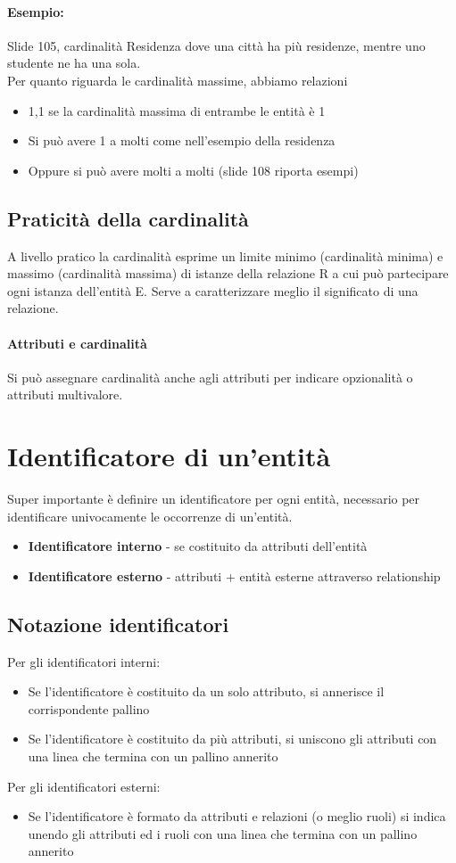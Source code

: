 \paragraph*{Esempio:} Slide 105, cardinalità Residenza dove una città ha più residenze,
mentre uno studente ne ha una sola.
\\ Per quanto riguarda le cardinalità massime, abbiamo relazioni
\begin{itemize}
    \item 1,1 se la cardinalità massima di entrambe le entità è 1
    \item Si può avere 1 a molti come nell'esempio della residenza
    \item Oppure si può avere molti a molti (slide 108 riporta esempi)
\end{itemize}
\subsection*{Praticità della cardinalità}
A livello pratico la cardinalità esprime un limite minimo (cardinalità minima)
e massimo (cardinalità massima) di istanze della relazione R a cui può partecipare
ogni istanza dell'entità E. Serve a caratterizzare meglio il significato di una relazione.
\paragraph*{Attributi e cardinalità} Si può assegnare cardinalità anche agli attributi
per indicare opzionalità o attributi multivalore.
\section{Identificatore di un'entità}
Super importante è definire un identificatore per ogni entità, necessario per identificare
univocamente le occorrenze di un'entità.
\begin{itemize}
    \item \textbf{Identificatore interno} - se costituito da attributi dell'entità
    \item \textbf{Identificatore esterno} - attributi + entità esterne attraverso relationship
\end{itemize}
\subsection*{Notazione identificatori}
Per gli identificatori interni:
\begin{itemize}
    \item Se l'identificatore è costituito da un solo attributo, si annerisce il corrispondente
    pallino
    \item Se l'identificatore è costituito da più attributi, si uniscono gli attributi con
    una linea che termina con un pallino annerito
\end{itemize}
Per gli identificatori esterni:
\begin{itemize}
    \item Se l'identificatore è formato da attributi e relazioni (o meglio ruoli) si
    indica unendo gli attributi ed i ruoli con una linea che termina con un pallino annerito
\end{itemize}
